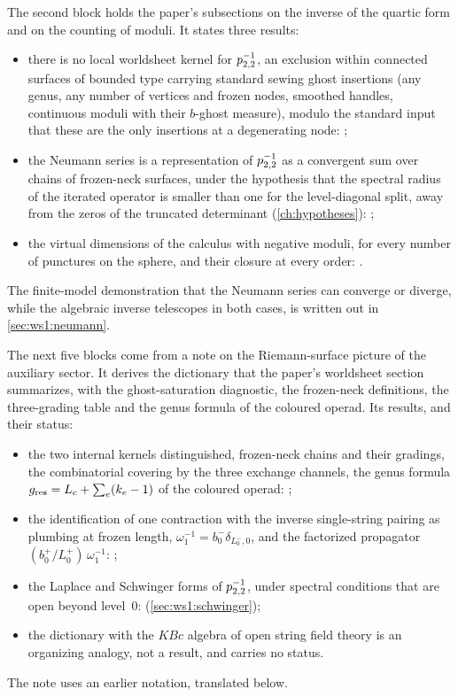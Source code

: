 The second block holds the paper's subsections on the inverse of the quartic form and on the counting of moduli.
It states three results:
\begin{itemize}
  \item there is no local worldsheet kernel for $p_{2,2}^{-1}$, an exclusion within connected surfaces of bounded type carrying standard sewing ghost insertions (any genus, any number of vertices and frozen nodes, smoothed handles, continuous moduli with their $b$-ghost measure), modulo the standard input that these are the only insertions at a degenerating node: ;
  \item the Neumann series is a representation of $p_{2,2}^{-1}$ as a convergent sum over chains of frozen-neck surfaces, under the hypothesis that the spectral radius of the iterated operator is smaller than one for the level-diagonal split, away from the zeros of the truncated determinant (\cref{ch:hypotheses}): ;
  \item the virtual dimensions of the calculus with negative moduli, for every number of punctures on the sphere, and their closure at every order: .
\end{itemize}
The finite-model demonstration that the Neumann series can converge or diverge, while the algebraic inverse telescopes in both cases, is written out in \cref{sec:ws1:neumann}.



\medskip

\noindent
The next five blocks come from a note on the Riemann-surface picture of the auxiliary sector.
It derives the dictionary that the paper's worldsheet section summarizes, with the ghost-saturation diagnostic, the frozen-neck definitions, the three-grading table and the genus formula of the coloured operad.
Its results, and their status:
\begin{itemize}
  \item the two internal kernels distinguished, frozen-neck chains and their gradings, the combinatorial covering by the three exchange channels, the genus formula $g_{\rm res} = L_c + \sum_e (k_e - 1)$ of the coloured operad: ;
  \item the identification of one contraction with the inverse single-string pairing as plumbing at frozen length, $\omega_1^{-1} = b_0^- \delta_{L_0^-, 0}$, and the factorized propagator $(b_0^+ / L_0^+) \, \omega_1^{-1}$: ;
  \item the Laplace and Schwinger forms of $p_{2,2}^{-1}$, under spectral conditions that are open beyond level~$0$:  (\cref{sec:ws1:schwinger});
  \item the dictionary with the $KBc$ algebra of open string field theory is an organizing analogy, not a result, and carries no status.
\end{itemize}
The note uses an earlier notation, translated below.

